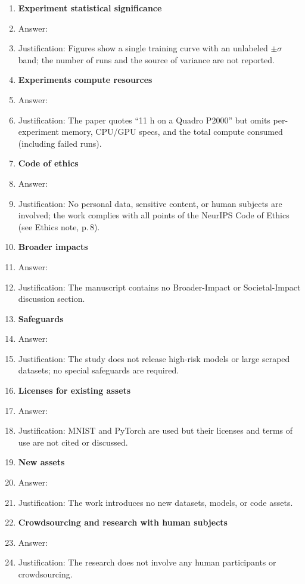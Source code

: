 \begin{enumerate}
\item {\bf Experiment statistical significance}  
    \item[] Answer: \answerNo{}  
    \item[] Justification: Figures show a single training curve with an unlabeled $\pm\sigma$ band; the number of runs and the source of variance are not reported.  

\item {\bf Experiments compute resources}  
    \item[] Answer: \answerNo{}  
    \item[] Justification: The paper quotes “11 h on a Quadro P2000” but omits per-experiment memory, CPU/GPU specs, and the total compute consumed (including failed runs).  

\item {\bf Code of ethics}  
    \item[] Answer: \answerYes{}  
    \item[] Justification: No personal data, sensitive content, or human subjects are involved; the work complies with all points of the NeurIPS Code of Ethics (see Ethics note, p.\,8).  

\item {\bf Broader impacts}  
    \item[] Answer: \answerNo{}  
    \item[] Justification: The manuscript contains no Broader-Impact or Societal-Impact discussion section.  

\item {\bf Safeguards}  
    \item[] Answer: \answerNA{}  
    \item[] Justification: The study does not release high-risk models or large scraped datasets; no special safeguards are required.  

\item {\bf Licenses for existing assets}  
    \item[] Answer: \answerNo{}  
    \item[] Justification: MNIST and PyTorch are used but their licenses and terms of use are not cited or discussed.  

\item {\bf New assets}  
    \item[] Answer: \answerNA{}  
    \item[] Justification: The work introduces no new datasets, models, or code assets.  

\item {\bf Crowdsourcing and research with human subjects}  
    \item[] Answer: \answerNA{}  
    \item[] Justification: The research does not involve any human participants or crowdsourcing.  


\end{enumerate}
